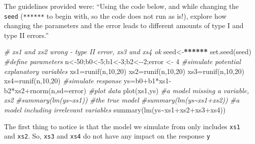 \documentclass[
]{book}
\newenvironment{Shaded}{\begin{snugshade}}{\end{snugshade}}
\newcommand{\AttributeTok}[1]{\textcolor[rgb]{0.77,0.63,0.00}{#1}}
\newcommand{\CommentTok}[1]{\textcolor[rgb]{0.56,0.35,0.01}{\textit{#1}}}
\newcommand{\DecValTok}[1]{\textcolor[rgb]{0.00,0.00,0.81}{#1}}
\newcommand{\ErrorTok}[1]{\textcolor[rgb]{0.64,0.00,0.00}{\textbf{#1}}}
\newcommand{\FunctionTok}[1]{\textcolor[rgb]{0.00,0.00,0.00}{#1}}
\newcommand{\NormalTok}[1]{#1}
\newcommand{\OtherTok}[1]{\textcolor[rgb]{0.56,0.35,0.01}{#1}}
\newcommand{\SpecialCharTok}[1]{\textcolor[rgb]{0.00,0.00,0.00}{#1}}
\begin{document}
The guidelines provided were: ``Using the code below, and while changing the \texttt{seed} (\texttt{******} to begin with, so the code does not run as is!), explore how changing the parameters and the error leads to different amounts of type I and type II errors.''

\begin{Shaded}
\begin{Highlighting}[]
\CommentTok{\# xs1 and xs2 wrong {-} type II error, xs3 and xs4 ok}
\NormalTok{seed}\OtherTok{\textless{}{-}}\ErrorTok{******}
\FunctionTok{set.seed}\NormalTok{(seed)}
\CommentTok{\#define parameters}
\NormalTok{n}\OtherTok{\textless{}{-}}\DecValTok{50}\NormalTok{;b0}\OtherTok{\textless{}{-}}\DecValTok{5}\NormalTok{;b1}\OtherTok{\textless{}{-}}\DecValTok{3}\NormalTok{;b2}\OtherTok{\textless{}{-}}\SpecialCharTok{{-}}\DecValTok{2}\NormalTok{;error }\OtherTok{\textless{}{-}} \DecValTok{4}
\CommentTok{\#simulate potential explanatory variables}
\NormalTok{xs1}\OtherTok{=}\FunctionTok{runif}\NormalTok{(n,}\DecValTok{10}\NormalTok{,}\DecValTok{20}\NormalTok{)}
\NormalTok{xs2}\OtherTok{=}\FunctionTok{runif}\NormalTok{(n,}\DecValTok{10}\NormalTok{,}\DecValTok{20}\NormalTok{)}
\NormalTok{xs3}\OtherTok{=}\FunctionTok{runif}\NormalTok{(n,}\DecValTok{10}\NormalTok{,}\DecValTok{20}\NormalTok{)}
\NormalTok{xs4}\OtherTok{=}\FunctionTok{runif}\NormalTok{(n,}\DecValTok{10}\NormalTok{,}\DecValTok{20}\NormalTok{)}
\CommentTok{\#simulate response}
\NormalTok{ys}\OtherTok{=}\NormalTok{b0}\SpecialCharTok{+}\NormalTok{b1}\SpecialCharTok{*}\NormalTok{xs1}\SpecialCharTok{{-}}\NormalTok{b2}\SpecialCharTok{*}\NormalTok{xs2}\SpecialCharTok{+}\FunctionTok{rnorm}\NormalTok{(n,}\AttributeTok{sd=}\NormalTok{error)}
\CommentTok{\#plot data}
\FunctionTok{plot}\NormalTok{(xs1,ys)}
\CommentTok{\#a model missing a variable, xs2}
\CommentTok{\#summary(lm(ys\textasciitilde{}xs1))}
\CommentTok{\#the true model}
\CommentTok{\#summary(lm(ys\textasciitilde{}xs1+xs2))}
\CommentTok{\#a model including irrelevant variables}
\FunctionTok{summary}\NormalTok{(}\FunctionTok{lm}\NormalTok{(ys}\SpecialCharTok{\textasciitilde{}}\NormalTok{xs1}\SpecialCharTok{+}\NormalTok{xs2}\SpecialCharTok{+}\NormalTok{xs3}\SpecialCharTok{+}\NormalTok{xs4))}
\end{Highlighting}
\end{Shaded}

The first thing to notice is that the model we simulate from only includes \texttt{xs1} and \texttt{xs2}. So, \texttt{xs3} and \texttt{xs4} do not have any impact on the response \texttt{y}
\end{document}
